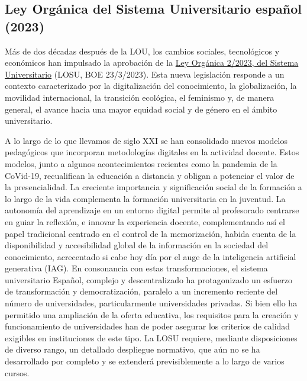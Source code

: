 \documentclass[
  11pt,
  a4paper,
  twoside]{scrreprt}
\begin{document}
\subsection{Ley Orgánica del Sistema Universitario español
(2023)}\label{sec-losu}

Más de dos décadas después de la LOU, los cambios sociales, tecnológicos
y económicos han impulsado la aprobación de la
\href{https://www.boe.es/buscar/act.php?id=BOE-A-2023-7500}{Ley Orgánica
2/2023, del Sistema Universitario} (LOSU, BOE 23/3/2023). Esta nueva
legislación responde a un contexto caracterizado por la digitalización
del conocimiento, la globalización, la movilidad internacional, la
transición ecológica, el feminismo y, de manera general, el avance hacia
una mayor equidad social y de género en el ámbito universitario.

A lo largo de lo que llevamos de siglo XXI se han consolidado nuevos
modelos pedagógicos que incorporan metodologías digitales en la
actividad docente. Estos modelos, junto a algunos acontecimientos
recientes como la pandemia de la CoVid-19, recualifican la educación a
distancia y obligan a potenciar el valor de la presencialidad. La
creciente importancia y significación social de la formación a lo largo
de la vida complementa la formación universitaria en la juventud. La
autonomía del aprendizaje en un entorno digital permite al profesorado
centrarse en guiar la reflexión, e innovar la experiencia docente,
complementando así el papel tradicional centrado en el control de la
memorización, habida cuenta de la disponibilidad y accesibilidad global
de la información en la sociedad del conocimiento, acrecentado si cabe
hoy día por el auge de la inteligencia artificial generativa (IAG). En
consonancia con estas transformaciones, el sistema universitario
Español, complejo y descentralizado ha protagonizado un esfuerzo de
transformación y democratización, paralelo a un incremento reciente del
número de universidades, particularmente universidades privadas. Si bien
ello ha permitido una ampliación de la oferta educativa, los requisitos
para la creación y funcionamiento de universidades han de poder asegurar
los criterios de calidad exigibles en instituciones de este tipo. La
LOSU requiere, mediante disposiciones de diverso rango, un detallado
despliegue normativo, que aún no se ha desarrollado por completo y se
extenderá previsiblemente a lo largo de varios cursos.
\end{document}
